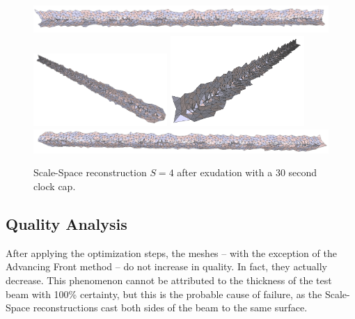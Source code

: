 \documentclass[12pt]{drexelthesis}
\let\Oldsubsection\subsection
\renewcommand{\subsection}{\FloatBarrier\Oldsubsection}
\begin{document}
\begin{figure}[!ht]
	\centering
		\includegraphics[width=5in]{simulated-lab-scan/0noise/optimizedNeat/scalespace4everything00.png}
		\includegraphics[width=2in]{simulated-lab-scan/0noise/optimizedNeat/scalespace4everything01.png}
		\includegraphics[width=2in]{simulated-lab-scan/0noise/optimizedNeat/scalespace4everything02.png}
		\includegraphics[width=5in]{simulated-lab-scan/0noise/optimizedNeat/scalespace4everything03.png}
		\caption[Scale-Space reconstruction $S = 4$ after exudation with a 30 second clock cap]{\centering Scale-Space reconstruction $S = 4$ after exudation with a 30 second clock cap.}
	\label{zeronoise:scalespace4everything}
\end{figure}

\subsection{Quality Analysis}

After applying the optimization steps, the meshes -- with the exception of the Advancing Front method -- do not increase in quality. In fact, they actually decrease. This phenomenon cannot be attributed to the thickness of the test beam with 100\% certainty, but this is the probable cause of failure, as the Scale-Space reconstructions cast both sides of the beam to the same surface.
\end{document}
